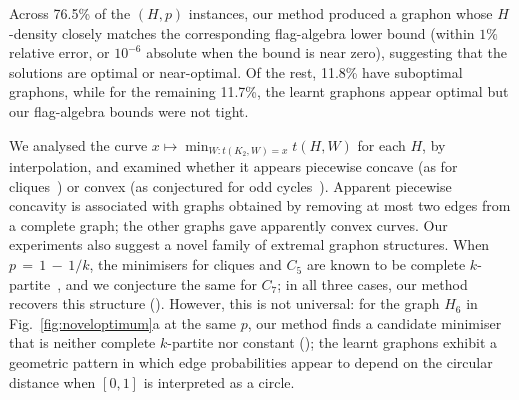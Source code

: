 \documentclass{article}
\theoremstyle{plain}
\theoremstyle{definition}
\theoremstyle{remark}
\begin{document}
Across 76.5\% of the $(H,p)$ instances, our method produced a graphon whose $H$-density closely matches the corresponding flag-algebra lower bound (within $1\%$ relative error, or $10^{-6}$ absolute when the bound is near zero), suggesting that the solutions are optimal or near-optimal. Of the rest, 11.8\% have suboptimal graphons, while for the remaining 11.7\%, the learnt graphons appear optimal but our flag-algebra bounds were not tight.

We analysed the curve $x \mapsto \min_{W:t(K_2,W)=x} t(H,W)$ for each $H$, by interpolation, and examined whether it appears piecewise concave (as for cliques~\citep{reiher2016clique}) or convex (as conjectured for odd cycles~\citep{bennett2020minimizing}). Apparent piecewise concavity is associated with graphs obtained by removing at most two edges from a complete graph; the other graphs gave apparently convex curves.
%
Our experiments also suggest a novel family of extremal graphon structures. When $p \,{=}\, 1 \,{-}\, 1/k$, the minimisers for cliques and $C_5$ are known to be complete $k$-partite~\citep{reiher2016clique,bennett2020minimizing}, and we conjecture the same for $C_7$; in all three cases, our method recovers this structure (). However, this is not universal: for the graph $H_6$ in Fig.~\ref{fig:noveloptimum}a at the same $p$, our method finds a candidate minimiser that is neither complete $k$-partite nor constant (); the learnt graphons exhibit a geometric pattern in which edge probabilities appear to depend on the circular distance when $[0,1]$ is interpreted as a circle.
\end{document}
